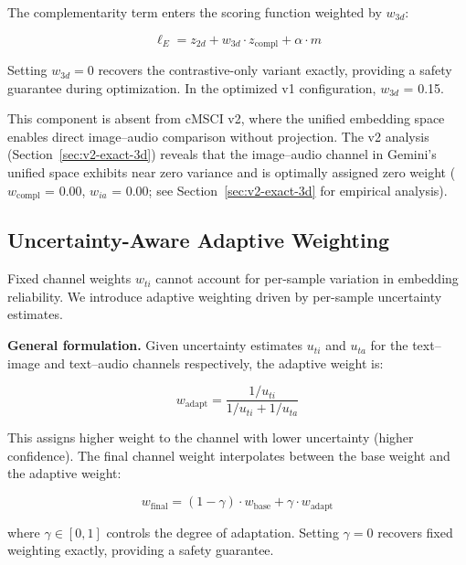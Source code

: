 \documentclass[a4paper,fleqn]{cas-sc}
\begin{document}
\begin{itemize}
The complementarity term enters the scoring function weighted by $w_{3d}$:

\begin{equation}\label{eq:logit-e}
\ell_E = z_{2d} + w_{3d} \cdot z_{\mathrm{compl}} + \alpha \cdot m
\end{equation}

Setting $w_{3d} = 0$ recovers the contrastive-only variant exactly, providing a safety guarantee during optimization. In the optimized v1 configuration, $w_{3d}$ = 0.15.

This component is absent from cMSCI v2, where the unified embedding space enables direct image--audio comparison without projection. The v2 analysis (Section~\ref{sec:v2-exact-3d}) reveals that the image--audio channel in Gemini's unified space exhibits near zero variance and is optimally assigned zero weight ($w_{\mathrm{compl}}$ = 0.00, $w_{ia}$ = 0.00; see Section~\ref{sec:v2-exact-3d} for empirical analysis).


\subsection{Uncertainty-Aware Adaptive Weighting}\label{sec:adaptive-weighting}

Fixed channel weights $w_{ti}$ cannot account for per-sample variation in embedding reliability. We introduce adaptive weighting driven by per-sample uncertainty estimates.

\textbf{General formulation.} Given uncertainty estimates $u_{ti}$ and $u_{ta}$ for the text--image and text--audio channels respectively, the adaptive weight is:

\begin{equation}\label{eq:adaptive-weight}
w_{\mathrm{adapt}} = \frac{1/u_{ti}}{1/u_{ti} + 1/u_{ta}}
\end{equation}

This assigns higher weight to the channel with lower uncertainty (higher confidence). The final channel weight interpolates between the base weight and the adaptive weight:

\begin{equation}\label{eq:final-weight}
w_{\mathrm{final}} = (1 - \gamma) \cdot w_{\mathrm{base}} + \gamma \cdot w_{\mathrm{adapt}}
\end{equation}

where $\gamma \in [0, 1]$ controls the degree of adaptation. Setting $\gamma = 0$ recovers fixed weighting exactly, providing a safety guarantee.


\end{itemize}
\end{document}
